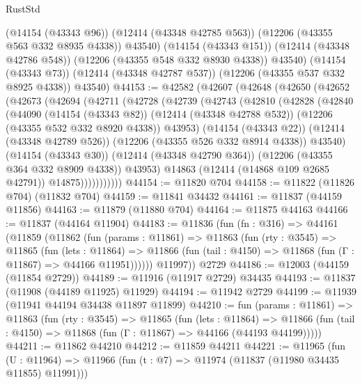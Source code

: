 \begin{lexlean}{RustStd}
\begin{coremodule}
          (@14154 (@43343 @96))
          (@12414 (@43348 @42785 @563))
          (@12206 (@43355 @563 @332 @8935 @4338))
          @43540)
        (@14154 (@43343 @151))
        (@12414 (@43348 @42786 @548))
        (@12206 (@43355 @548 @332 @8930 @4338))
        @43540)
      (@14154 (@43343 @73))
      (@12414 (@43348 @42787 @537))
      (@12206 (@43355 @537 @332 @8925 @4338))
      @43540)
@44153 := @42582
    (@42607
      (@42648
        (@42650
          (@42652
            (@42673
              (@42694
                (@42711
                  (@42728
                    (@42739
                      (@42743
                        (@42810
                          (@42828
                            (@42840
                              (@44090
                                (@14154 (@43343 @82))
                                (@12414 (@43348 @42788 @532))
                                (@12206 (@43355 @532 @332 @8920 @4338))
                                @43953)
                              (@14154 (@43343 @22))
                              (@12414 (@43348 @42789 @526))
                              (@12206 (@43355 @526 @332 @8914 @4338))
                              @43540)
                            (@14154 (@43343 @30))
                            (@12414 (@43348 @42790 @364))
                            (@12206 (@43355 @364 @332 @8909 @4338))
                            @43953)
                          @14863
                          (@12414 (@14868 @109 @2685 @42791))
                          @14875)))))))))))
@44154 := @11820 @704
@44158 := @11822 (@11826 @704) (@11832 @704)
@44159 := @11841 @34432
@44161 := @11837 (@44159 @11856)
@44163 := @11879 (@11880 @704)
@44164 := @11875 @44163
@44166 := @11837 (@44164 @11904)
@44183 := @11836
    (fun (fn : @316) =>
    @44161
      (@11859
        (@11862
          (fun (params : @11861) =>
          @11863
            (fun (rty : @3545) =>
            @11865
              (fun (lets : @11864) =>
              @11866 (fun (tail : @4150) => @11868 (fun (Γ : @11867) => @44166 @11951))))))
        @11997))
    @2729
@44186 := @12003 (@44159 (@11854 @2729))
@44189 := @11916 (@11917 @2729) @34435
@44193 := @11837 (@11908 (@44189 @11925) @11929)
@44194 := @11942 @2729
@44199 := @11939 (@11941 @44194 @34438 @11897 @11899)
@44210 := fun (params : @11861) =>
  @11863
    (fun (rty : @3545) =>
    @11865
      (fun (lets : @11864) =>
      @11866 (fun (tail : @4150) => @11868 (fun (Γ : @11867) => @44166 (@44193 @44199)))))
@44211 := @11862 @44210
@44212 := @11859 @44211
@44221 := @11965
    (fun (U : @11964) => @11966 (fun (t : @7) => @11974 (@11837 (@11980 @34435 @11855) @11991)))

\end{coremodule}
\end{lexlean}
